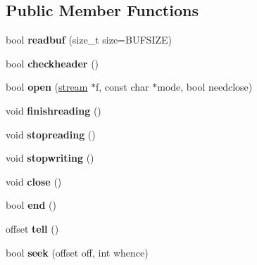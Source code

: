 \subsection*{Public Member Functions}
\begin{DoxyCompactItemize}
\item 
\mbox{\label{structutf8stream_a5a5de465a8ba65d4ee7df313f3474664}} 
bool {\bfseries readbuf} (size\+\_\+t size=B\+U\+F\+S\+I\+ZE)
\item 
\mbox{\label{structutf8stream_a8b70b64dd68e0c354314607d22a9eb1a}} 
bool {\bfseries checkheader} ()
\item 
\mbox{\label{structutf8stream_a3ce552942d3002dc901ba52efe08a14d}} 
bool {\bfseries open} (\hyperlink{structstream}{stream} $\ast$f, const char $\ast$mode, bool needclose)
\item 
\mbox{\label{structutf8stream_acf50a6ba63185ab1f1160597fd0b26c6}} 
void {\bfseries finishreading} ()
\item 
\mbox{\label{structutf8stream_a14eea012b71ce6fe77e6ebc5b7296aa2}} 
void {\bfseries stopreading} ()
\item 
\mbox{\label{structutf8stream_a4b20fab66cdb930f4b3c8345fa8596ce}} 
void {\bfseries stopwriting} ()
\item 
\mbox{\label{structutf8stream_aa4791819dd4e90ce2339667f43339c41}} 
void {\bfseries close} ()
\item 
\mbox{\label{structutf8stream_ada7dfa3f25e5b80e2d93f751f0d34819}} 
bool {\bfseries end} ()
\item 
\mbox{\label{structutf8stream_a7eb6abce80bab8145350bd1902516a98}} 
offset {\bfseries tell} ()
\item 
\mbox{\label{structutf8stream_a4fe76ef7eda75c06ddd8762f815ef5ad}} 
bool {\bfseries seek} (offset off, int whence)
\item 
\mbox{\label{structutf8stream_a31f3af9959b2cdbe3c5cd2d4eb49db4b}} 

\end{DoxyCompactItemize}
